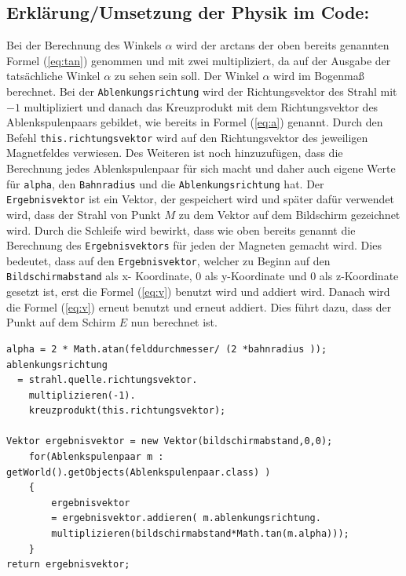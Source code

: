 




\subsection{Erklärung/Umsetzung der Physik im Code:}

Bei der Berechnung des Winkels $\alpha$ wird der arctans der oben bereits genannten Formel (\ref{eq:tan}) genommen und mit zwei multipliziert, da auf der Ausgabe der tatsächliche Winkel $\alpha$ zu sehen sein soll.
Der Winkel $\alpha$ wird im Bogenmaß berechnet.
Bei der \lstinline$Ablenkungsrichtung$ wird der Richtungsvektor des Strahl mit $-1$ multipliziert und danach das Kreuzprodukt mit dem Richtungsvektor des Ablenkspulenpaars gebildet, wie bereits in Formel (\ref{eq:a}) genannt.
Durch den Befehl \lstinline$this.richtungsvektor$ wird auf den Richtungsvektor des jeweiligen Magnetfeldes verwiesen.
Des Weiteren ist noch hinzuzufügen, dass die Berechnung jedes Ablenkspulenpaar für sich macht und daher auch eigene Werte für \lstinline$alpha$, den \lstinline$Bahnradius$ und die \lstinline$Ablenkungsrichtung$ hat.
Der \lstinline$Ergebnisvektor$ ist ein Vektor, der gespeichert wird und später dafür verwendet wird, dass der Strahl von Punkt $M$ zu dem Vektor auf dem Bildschirm gezeichnet wird.
Durch die Schleife wird bewirkt, dass wie oben bereits genannt die Berechnung des \lstinline$Ergebnisvektors$ für jeden der Magneten gemacht wird.
Dies bedeutet, dass auf den \lstinline$Ergebnisvektor$, welcher zu Beginn auf den \lstinline$Bildschirmabstand$ als x- Koordinate, $0$ als y-Koordinate und 0 als z-Koordinate gesetzt ist, erst die Formel (\ref{eq:v}) benutzt wird und addiert wird.
Danach wird die Formel (\ref{eq:v}) erneut benutzt und erneut addiert. Dies führt dazu, dass der Punkt auf dem Schirm $E$ nun berechnet ist.

\begin{lstlisting}
alpha = 2 * Math.atan(felddurchmesser/ (2 *bahnradius ));
ablenkungsrichtung
  = strahl.quelle.richtungsvektor.
    multiplizieren(-1).
    kreuzprodukt(this.richtungsvektor);

Vektor ergebnisvektor = new Vektor(bildschirmabstand,0,0);
    for(Ablenkspulenpaar m : getWorld().getObjects(Ablenkspulenpaar.class) )
    {
        ergebnisvektor 
        = ergebnisvektor.addieren( m.ablenkungsrichtung.
        multiplizieren(bildschirmabstand*Math.tan(m.alpha)));
    }
return ergebnisvektor;

\end{lstlisting}

